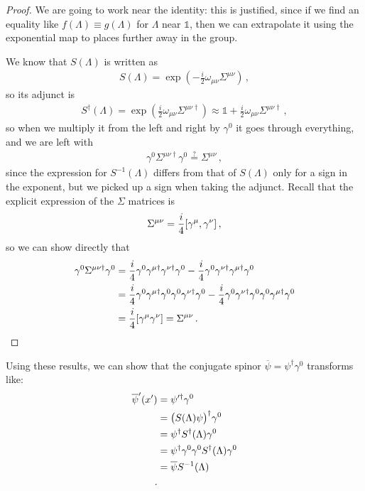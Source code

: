 \documentclass[main.tex]{subfiles}
\begin{document}
\begin{proof}
We are going to work near the identity: this is justified, since if we find an equality like \(f(\Lambda ) \equiv g(\Lambda )\) for \(\Lambda \) near \(\mathbb{1}\), then we can extrapolate it using the exponential map to places further away in the group.


We know that \(S(\Lambda )\) is written as 
%
\begin{align}
S(\Lambda )=   \exp( -\frac{i}{2} \omega_{\mu \nu } \Sigma^{\mu \nu })
\,,
\end{align}
%
so its adjunct is 
%
\begin{align}
S ^\dag (\Lambda ) = \exp( \frac{i}{2} \omega_{\mu \nu } \Sigma^{\mu \nu \dag}) \approx \mathbb{1} + \frac{i}{2} \omega_{\mu \nu } \Sigma^{\mu \nu \dag}
\,,
\end{align}
%
so when we multiply it from the left and right by \(\gamma^{0}\) it goes through everything, and we are left with 
%
\begin{align}
\gamma^{0} \Sigma^{\mu \nu \dag} \gamma^{0} \overset{?}{=} 
\Sigma^{\mu \nu }
\,,
\end{align}
%
since the expression for \(S^{-1}(\Lambda )\) differs from that of \(S(\Lambda )\) only for a sign in the exponent, but we picked up a sign when taking the adjunct. 
Recall that the explicit expression of the \(\Sigma \) matrices is 
%
\begin{align}
\Sigma^{\mu \nu } = \frac{i}{4} \qty[\gamma^{\mu }, \gamma^{\nu }]
\,,
\end{align}
%
so we can show directly that 
%
\begin{align}
\gamma^{0} \Sigma^{\mu \nu \dag} \gamma^{0} &=
\frac{i}{4} \gamma^{0} \gamma^{\mu \dag}  \gamma^{\nu\dag } \gamma^{0 }
-\frac{i}{4} \gamma^{0} \gamma^{\nu\dag }  \gamma^{\mu \dag} \gamma^{0 } \\
&= 
\frac{i}{4} \gamma^{0} \gamma^{\mu \dag} \gamma^{0} \gamma^{0} \gamma^{\nu\dag } \gamma^{0 }
-\frac{i}{4} \gamma^{0} \gamma^{\nu\dag }  \gamma^{0} \gamma^{0} \gamma^{\mu \dag} \gamma^{0 }  \\
&= \frac{i}{4} \qty[\gamma^{\mu } \gamma^{\nu }] = \Sigma^{\mu \nu }
\,.
\end{align}
\end{proof}

Using these results, we can show that the conjugate spinor \(\overline{\psi} = \psi ^\dag \gamma^{0}\) transforms like: 
%
\begin{align}
\overline{\psi}' (x') &= \psi^{\prime \dag} \gamma^{0}  \\
&= \qty(S(\Lambda ) \psi ) ^\dag \gamma^{0}  \\
&= \psi ^\dag S ^\dag (\Lambda ) \gamma^{0} \\
&= \psi ^\dag \gamma^{0} \gamma^{0} S ^\dag (\Lambda ) \gamma^{0} \\
&= \overline{\psi} S^{-1}(\Lambda ) \\
\,.
\end{align}
\end{document}
